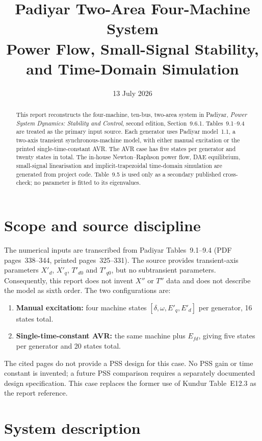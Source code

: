 \documentclass[12pt,a4paper]{article}
\title{\textbf{Padiyar Two-Area Four-Machine System}\\
\large Power Flow, Small-Signal Stability, and Time-Domain Simulation}
\date{13 July 2026}
\begin{document}
\maketitle

\begin{abstract}
This report reconstructs the four-machine, ten-bus, two-area system in
Padiyar, \emph{Power System Dynamics: Stability and Control}, second edition,
Section~9.6.1. Tables~9.1--9.4 are treated as the primary input source. Each
generator uses Padiyar model~1.1, a two-axis transient synchronous-machine
model, with either manual excitation or the printed single-time-constant AVR.
The AVR case has five states per generator and twenty states in total. The
in-house Newton--Raphson power flow, DAE equilibrium, small-signal
linearisation and implicit-trapezoidal time-domain simulation are generated from
project code. Table~9.5 is used only as a secondary published cross-check; no
parameter is fitted to its eigenvalues.
\end{abstract}
\newpage
\tableofcontents
\newpage

\section{Scope and source discipline}

The numerical inputs are transcribed from Padiyar Tables~9.1--9.4 (PDF
pages~338--344, printed pages~325--331). The source provides transient-axis
parameters $X'_d$, $X'_q$, $T'_{d0}$ and $T'_{q0}$, but no subtransient
parameters. Consequently, this report does not invent $X''$ or $T''$ data and
does not describe the model as sixth order. The two configurations are:

\begin{enumerate}
  \item \textbf{Manual excitation:} four machine states
  $[\delta,\omega,E'_q,E'_d]$ per generator, 16 states total.
  \item \textbf{Single-time-constant AVR:} the same machine plus $E_{fd}$,
  giving five states per generator and 20 states total.
\end{enumerate}

The cited pages do not provide a PSS design for this case. No PSS gain or time
constant is invented; a future PSS comparison requires a separately documented
design specification. This case replaces the former use of Kundur Table~E12.3
as the report reference.

\section{System description}
\end{document}
